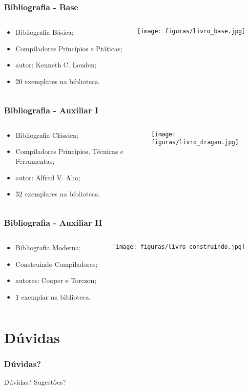 \documentclass[table]{beamer}
\begin{document}
\begin{frame}
   \frametitle{Bibliografia - Base}
   \begin{columns}
      \begin{column}{0.5\textwidth}
         \begin{itemize}
	    \item Bibliografia Básica;
	    \item Compiladores Princípios e Práticas;
	    \item autor: Kenneth C. Louden;
	    \item 20 exemplares na biblioteca.
	 \end{itemize}
      \end{column}
      \begin{column}{0.5\textwidth}
      \texttt{[image: figuras/livro\_base.jpg]}
      \end{column}
   \end{columns}
\end{frame}

\begin{frame}
   \frametitle{Bibliografia - Auxiliar I}
   \begin{columns}
      \begin{column}{0.5\textwidth}
         \begin{itemize}
	    \item Bibliografia Clássica;
	    \item Compiladores Princípios, Técnicas e Ferramentas;
	    \item autor: Alfred V. Aho;
	    \item 32 exemplares na biblioteca.
	 \end{itemize}
      \end{column}
      \begin{column}{0.5\textwidth}
      \texttt{[image: figuras/livro\_dragao.jpg]}
      \end{column}
   \end{columns}
\end{frame}

\begin{frame}
   \frametitle{Bibliografia - Auxiliar II}
   \begin{columns}
      \begin{column}{0.5\textwidth}
         \begin{itemize}
	    \item Bibliografia Moderna;
	    \item Construindo Compiladores;
	    \item autores: Cooper e Torczon;
	    \item 1 exemplar na biblioteca.
	 \end{itemize}
      \end{column}
      \begin{column}{0.5\textwidth}
      \texttt{[image: figuras/livro\_construindo.jpg]}
      \end{column}
   \end{columns}
\end{frame}

\section{Dúvidas}
\begin{frame}
   \frametitle{Dúvidas?}
   Dúvidas? Sugestões?
\end{frame}
\end{document}
